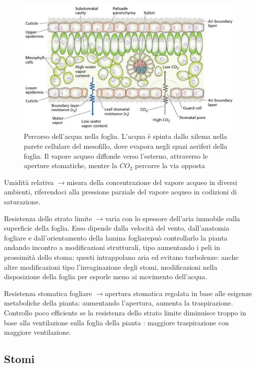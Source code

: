 \documentclass[a4paper,12pt]{book}
\newcommand{\lfreccia}{\ensuremath{\longrightarrow}}
\begin{document}
\begin{figure}[H]
\centering
\includegraphics[scale=0.5]{immagini/stomi.jpg}
\caption{Percorso dell'acqua nella foglia. L'acqua è spinta dallo xilema nella parete cellulare del mesofillo, dove evapora negli spazi aeriferi della foglia. Il vapore acqueo diffonde verso l'esterno, attraverso le aperture stomatiche, mentre la $CO_{2}$ percorre la via opposta}
\end{figure}
Umidità relativa \lfreccia misura della concentrazione del vapore acqueo in diversi ambienti, riferendoci alla pressione parziale del vapore acqueo in codizioni di saturazione.

Resistenza dello strato limite \lfreccia varia con lo spessore dell'aria immobile sulla superficie della foglia. Esso dipende dalla velocità del vento, dall'anatomia fogliare e dall'orientamento della lamina fogliarepuò controllarlo la pianta andando incontro a modificazioni strutturali, tipo aumentando i peli in prossimità dello stoma: questi intrappolano aria ed evitano turbolenze: anche altre modificazioni tipo l'invaginazione degli stomi, modificazioni nella disposizione della foglia per esporle meno ai movimento dell'acqua.

Resistenza stomatica fogliare \lfreccia apertura stomatica regolata in base alle esigenze metaboliche della pianta: aumentando l'apertura, aumenta la traspirazione. Controllo poco efficiente se la resistenza dello strato limite diminuisce troppo in base alla ventilazione sulla foglia della pianta :  maggiore traspirazione con maggiore ventilazione.

\subsection{Stomi}
\end{document}
